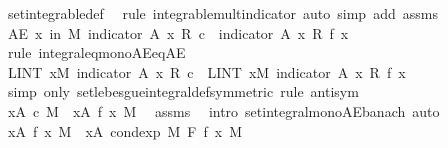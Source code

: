 \begin{isabellebody}
\ set{\isacharunderscore}{\kern0pt}integrable{\isacharunderscore}{\kern0pt}def\ \isamarkupfalse%
\ {\isacharparenleft}{\kern0pt}rule\ integrable{\isacharunderscore}{\kern0pt}mult{\isacharunderscore}{\kern0pt}indicator{\isacharcomma}{\kern0pt}\ auto\ simp\ add{\isacharcolon}{\kern0pt}\ assms{\isacharparenleft}{\kern0pt}{}{\isacharparenright}{\kern0pt}{\isacharparenright}{\kern0pt}\isanewline
\ \ \ \ \isamarkupfalse%
\ {\isachardoublequoteopen}AE\ x\ in\ M{\isachardot}{\kern0pt}\ indicator\ A\ x\ {\isacharasterisk}{\kern0pt}\isactrlsub R\ c\ {\isacharequal}{\kern0pt}\ indicator\ A\ x\ {\isacharasterisk}{\kern0pt}\isactrlsub R\ f\ x{\isachardoublequoteclose}\isanewline
\ \ \ \ \isamarkupfalse%
\ {\isacharparenleft}{\kern0pt}rule\ integral{\isacharunderscore}{\kern0pt}eq{\isacharunderscore}{\kern0pt}mono{\isacharunderscore}{\kern0pt}AE{\isacharunderscore}{\kern0pt}eq{\isacharunderscore}{\kern0pt}AE{\isacharparenright}{\kern0pt}\isanewline
\ \ \ \ \ \ \isamarkupfalse%
\ {\isachardoublequoteopen}LINT\ x{\isacharbar}{\kern0pt}M{\isachardot}{\kern0pt}\ indicator\ A\ x\ {\isacharasterisk}{\kern0pt}\isactrlsub R\ c\ {\isacharequal}{\kern0pt}\ LINT\ x{\isacharbar}{\kern0pt}M{\isachardot}{\kern0pt}\ indicator\ A\ x\ {\isacharasterisk}{\kern0pt}\isactrlsub R\ f\ x{\isachardoublequoteclose}\ \isanewline
\ \ \ \ \ \ \isamarkupfalse%
\ {\isacharparenleft}{\kern0pt}simp\ only{\isacharcolon}{\kern0pt}\ set{\isacharunderscore}{\kern0pt}lebesgue{\isacharunderscore}{\kern0pt}integral{\isacharunderscore}{\kern0pt}def{\isacharbrackleft}{\kern0pt}symmetric{\isacharbrackright}{\kern0pt}{\isacharcomma}{\kern0pt}\ rule\ antisym{\isacharparenright}{\kern0pt}\isanewline
\ \ \ \ \ \ \ \ \isamarkupfalse%
\ {\isachardoublequoteopen}{\isacharparenleft}{\kern0pt}{\isasymintegral}x{\isasymin}A{\isachardot}{\kern0pt}\ c\ {\isasympartial}M{\isacharparenright}{\kern0pt}\ {\isasymle}\ {\isacharparenleft}{\kern0pt}{\isasymintegral}x{\isasymin}A{\isachardot}{\kern0pt}\ f\ x\ {\isasympartial}M{\isacharparenright}{\kern0pt}{\isachardoublequoteclose}\ \isamarkupfalse%
\ assms{\isacharparenleft}{\kern0pt}{}{\isacharparenright}{\kern0pt}\ \isamarkupfalse%
\ {\isacharparenleft}{\kern0pt}intro\ set{\isacharunderscore}{\kern0pt}integral{\isacharunderscore}{\kern0pt}mono{\isacharunderscore}{\kern0pt}AE{\isacharunderscore}{\kern0pt}banach{\isacharparenright}{\kern0pt}\ auto\isanewline
\ \ \ \ \ \ \ \ \isamarkupfalse%
\ {\isachardoublequoteopen}{\isacharparenleft}{\kern0pt}{\isasymintegral}x{\isasymin}A{\isachardot}{\kern0pt}\ f\ x\ {\isasympartial}M{\isacharparenright}{\kern0pt}\ {\isacharequal}{\kern0pt}\ {\isacharparenleft}{\kern0pt}{\isasymintegral}x{\isasymin}A{\isachardot}{\kern0pt}\ cond{\isacharunderscore}{\kern0pt}exp\ M\ F\ f\ x\ {\isasympartial}M{\isacharparenright}{\kern0pt}{\isachardoublequoteclose}\ \isamarkupfalse%

\end{isabellebody}
